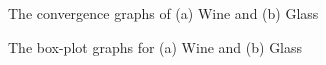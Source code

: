 \documentclass[review]{elsarticle}
\begin{document}
\begin{figure}



     \caption{\small{The convergence graphs of (a) Wine and  (b) Glass }}
 \label{fig:ConvergenceGraph1}
\end{figure}

\begin{figure} 
   

    
      \caption{\small {The box-plot graphs for (a) Wine and  (b) Glass}}
\label{fig:Boxplot1}
\end{figure}
\end{document}
